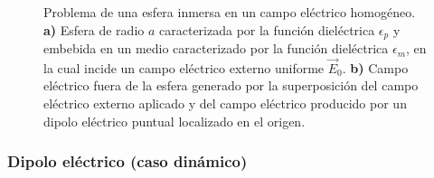 \begin{figure}[H]
	\centering
	\caption{Problema de una esfera inmersa en un campo eléctrico homogéneo. \textbf{a)} Esfera de radio $a$ caracterizada por la función dieléctrica $\epsilon_p$ y embebida en un medio caracterizado por la función dieléctrica $\epsilon_m$, en la cual incide un campo eléctrico externo uniforme $\Vec{E}_0$. \textbf{b)} Campo eléctrico fuera de la esfera generado por la superposición del campo eléctrico externo aplicado y del campo eléctrico producido por un dipolo eléctrico puntual localizado en el origen.}
	\label{steady_state}
\end{figure}
 

\subsubsection{Dipolo eléctrico (caso dinámico)}


